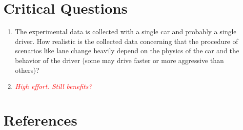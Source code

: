 \documentclass[oneside, notitlepage, twocolumn]{scrartcl}
\newcommand{\draft}[1]{\textcolor{red}{\textit{#1}}}
\begin{document}
\section{Critical Questions}
\begin{enumerate}
    \item The experimental data is collected with a single car and probably a single driver.
        How realistic is the collected data concerning that the procedure of scenarios like lane change heavily depend on the physics of the car and the behavior of the driver (some may drive faster or more aggressive than others)?
    \item \draft{High effort. Still benefits?}
\end{enumerate}

\section{References}
\begingroup
\renewcommand{\section}[2]{}%
\nocite{*}
\printbibliography%
\endgroup
\end{document}
